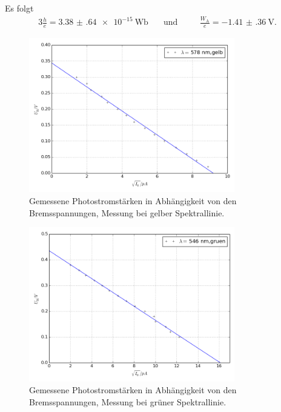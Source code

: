 Es folgt
\begin{alignat}{3}
	\frac{h}{e}=\SI{3.38(64)e-15}{\weber} \quad&\text{und} \quad&&\frac{W_\text{A}}{e}= \SI{-1.41(36)}{\volt}.
\end{alignat}



\begin{figure}[p]
	\centering
	\includegraphics[width=0.8\textwidth]{Bilder/Fit_gelb.png}
	\caption{Gemessene Photostromstärken in Abhängigkeit von den Bremsspannungen, Messung bei gelber Spektrallinie.}
	\label{fig:uidiagramm1}
\end{figure}
\begin{figure}[p]
	\centering
	\includegraphics[width=0.8\textwidth]{Bilder/Fit_gruen.png}
	\caption{Gemessene Photostromstärken in Abhängigkeit von den Bremsspannungen, Messung bei grüner Spektrallinie.}
\end{figure}

